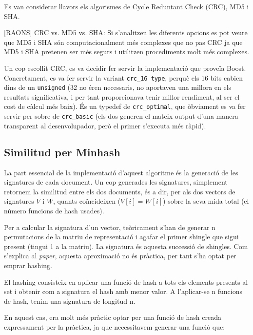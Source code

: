 \documentclass[catalan, 12pt]{report}
\begin{document}
Es van considerar llavors els algorismes de Cycle Reduntant Check (CRC), MD5 i SHA.

[RAONS] \newline
CRC vs. MD5 vs. SHA: Si s'analitzen les diferents opcions es pot veure que MD5 i SHA són computacionalment més complexes que no pas CRC ja que MD5 i SHA pretenen ser més segurs i utilitzen procediments molt més complexes. \newline

Un cop escollit CRC, es va decidir fer servir la implementació que proveïa Boost. Concretament, es va fer servir la variant \verb|crc_16 type|, perquè els 16 bits cabien dins de un \verb|unsigned| (32 no éren necessaris, no aportaven una millora en els resultats significativa, i per tant proporcionava tenir millor rendiment, al ser el cost de càlcul més baix). És un typedef de \verb|crc_optimal|, que òbviament es va fer servir per sobre de \verb|crc_basic| (els dos generen el mateix output d'una manera transparent al desenvolupador, però el primer s'executa més ràpid).

\subsection{Similitud per Minhash}

La part essencial de la implementació d'aquest algoritme és la generació de les signatures de cada document. Un cop generades les signatures, simplement retornem la similitud entre els dos documents, és a dir, per als dos vectors de signatures \(V\) i \(W\), quants coïncideixen (\(V[i] = W[i]\)) sobre la seva mida total (el número funcions de hash usades).\newline

Per a calcular la signatura d'un vector, teòricament s'han de generar n permutacions de la matriu de representació i agafar el primer shingle que sigui present (tingui 1 a la matriu). La signatura és aquesta successió de shingles. Com s'explica al \textit{paper}, aquesta aproximació no és pràctica, per tant s'ha optat per emprar hashing.\newline

El hashing consisteix en aplicar una funció de hash a tots els elements presents al set i obtenir com a signatura el hash amb menor valor. A l'aplicar-se n funcions de hash, tenim una signatura de longitud n.\newline

En aquest cas, era molt més pràctic optar per una funció de hash creada expressament per la pràctica, ja que necessitavem generar una funció que:
\end{document}
